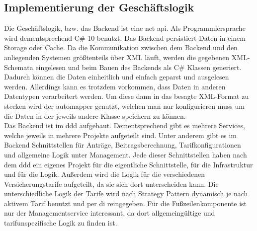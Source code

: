 \subsection{Implementierung der Geschäftslogik}
\label{geschaeftslogikimplementieren}
Die Geschäftslogik, bzw. das Backend ist eine \gls{net} \gls{api}. Als Programmiersprache wird dementsprechend C\# 10 benutzt. Das Backend persistiert Daten in einem Storage oder Cache.  Da die Kommunikation zwischen dem Backend und den anliegenden Systemen größtenteils über XML läuft, werden die gegebenen XML-Schemata eingelesen und beim Bauen des Backends als C\# Klassen generiert. Dadurch können die Daten einheitlich und einfach geparst und ausgelesen werden. Allerdings kann es trotzdem vorkommen, dass Daten in anderen Datentypen verarbeitert werden. Um diese dann in das besagte XML-Format zu stecken  wird der \gls{automapper} genutzt, welchen man nur konfigurieren muss um die Daten in der jeweils andere Klasse speichern zu können.\\

Das Backend ist im \gls{ddd} aufgebaut. Dementsprechend gibt es mehrere Services, welche jeweils in mehrere Projekte aufgeteilt sind. Unter anderem gibt es im Backend Schnittstellen für Anträge, Beitragsberechnung, Tarifkonfigurationen und allgemeine Logik unter Management. Jede dieser Schnittstellen haben nach dem \gls{ddd} ein eigenes Projekt für die eigentliche Schnittstelle, für die Infrastruktur und für die Logik. Außerdem wird die Logik für die verschiedenen Versicherungstarife aufgeteilt, da sie sich dort unterscheiden kann. Die unterschiedliche Logik der Tarife wird nach Strategy Pattern  dynamisch je nach aktivem Tarif benutzt und per \gls{di} reingegeben. Für die Fußzeilenkomponente ist nur der Managementservice interessant, da dort allgemeingültige und tarifunspezifische Logik zu finden ist.\\

